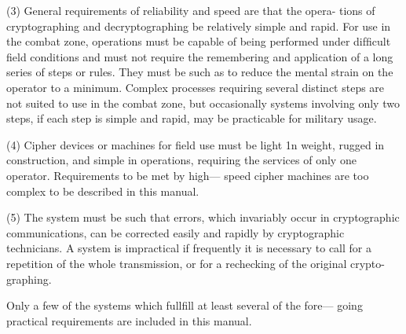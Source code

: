 (3) General requirements of reliability and speed are that the opera-
tions of cryptographing and decryptographing be relatively
simple and rapid. For use in the combat zone, operations must
be capable of being performed under difﬁcult ﬁeld conditions
and must not require the remembering and application of a
long series of steps or rules. They must be such as to reduce
the mental strain on the operator to a minimum. Complex
processes requiring several distinct steps are not suited to use
in the combat zone, but occasionally systems involving only
two steps, if each step is simple and rapid, may be practicable
for military usage.

(4) Cipher devices or machines for ﬁeld use must be light 1n weight,
rugged in construction, and simple in operations, requiring the
services of only one operator. Requirements to be met by high—
speed cipher machines are too complex to be described in this
manual.

(5) The system must be such that errors, which invariably occur in
cryptographic communications, can be corrected easily and
rapidly by cryptographic technicians. A system is impractical
if frequently it is necessary to call for a repetition of the whole
transmission, or for a rechecking of the original crypto-
graphing.

\mypara Only a few of the systems which fullfill at least several of the fore—
going practical requirements are included in this manual.
